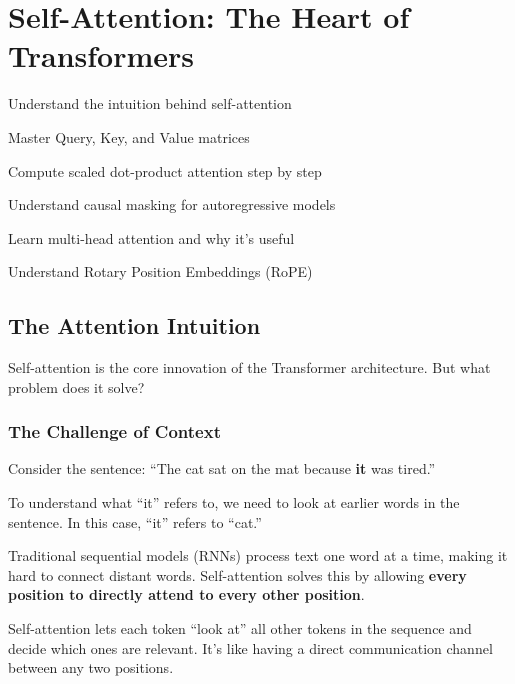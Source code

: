 \chapter{Self-Attention: The Heart of Transformers}
\label{ch:self-attention}

\begin{objectives}
    \item Understand the intuition behind self-attention
    \item Master Query, Key, and Value matrices
    \item Compute scaled dot-product attention step by step
    \item Understand causal masking for autoregressive models
    \item Learn multi-head attention and why it's useful
    \item Understand Rotary Position Embeddings (RoPE)
\end{objectives}

\section{The Attention Intuition}

Self-attention is the core innovation of the Transformer architecture. But what problem does it solve?

\subsection{The Challenge of Context}

Consider the sentence: ``The cat sat on the mat because \textbf{it} was tired.''

To understand what ``it'' refers to, we need to look at earlier words in the sentence. In this case, ``it'' refers to ``cat.''

Traditional sequential models (RNNs) process text one word at a time, making it hard to connect distant words. Self-attention solves this by allowing \textbf{every position to directly attend to every other position}.

\begin{keypoint}
Self-attention lets each token ``look at'' all other tokens in the sequence and decide which ones are relevant. It's like having a direct communication channel between any two positions.
\end{keypoint}

